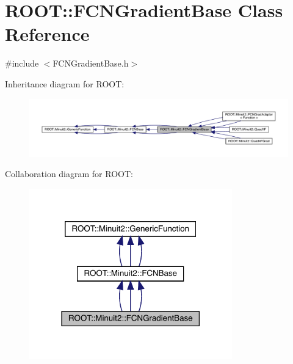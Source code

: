 \hypertarget{classROOT_1_1Minuit2_1_1FCNGradientBase}{}\section{R\+O\+OT\+:\+:F\+C\+N\+Gradient\+Base Class Reference}
\label{classROOT_1_1Minuit2_1_1FCNGradientBase}


{\ttfamily \#include $<$F\+C\+N\+Gradient\+Base.\+h$>$}



Inheritance diagram for R\+O\+OT\+:
\nopagebreak
\begin{figure}[H]
\begin{center}
\leavevmode
\includegraphics[width=350pt]{d8/d5e/classROOT_1_1Minuit2_1_1FCNGradientBase__inherit__graph}
\end{center}
\end{figure}


Collaboration diagram for R\+O\+OT\+:
\nopagebreak
\begin{figure}[H]
\begin{center}
\leavevmode
\includegraphics[width=249pt]{d5/d8c/classROOT_1_1Minuit2_1_1FCNGradientBase__coll__graph}
\end{center}
\end{figure}

